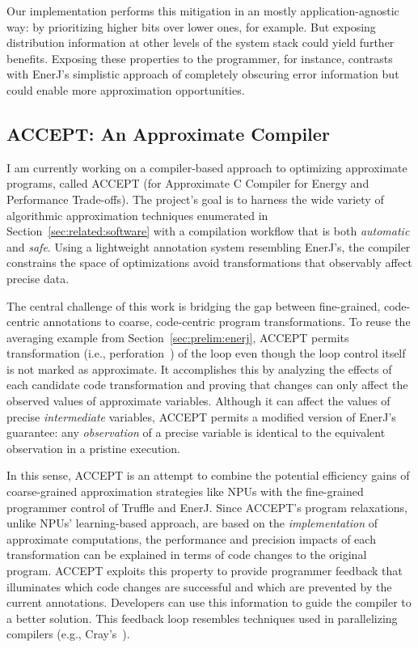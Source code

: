 Our implementation performs this mitigation in an mostly application-agnostic
way: by prioritizing higher bits over lower ones, for example. But exposing
distribution information at other levels of the system stack could yield
further benefits. Exposing these properties to the programmer, for instance,
contrasts with EnerJ's simplistic approach of completely obscuring error
information but could enable more approximation opportunities.

\subsection{ACCEPT: An Approximate Compiler}
\label{sec:prelim:accept}

I am currently working on a compiler-based approach to optimizing approximate
programs, called ACCEPT (for Approximate C Compiler for Energy and Performance
Trade-offs). The project's goal is to harness the wide variety of
algorithmic approximation techniques enumerated in
Section~\ref{sec:related:software} with a compilation workflow that is both
\emph{automatic} and \emph{safe}. Using a lightweight annotation system
resembling EnerJ's, the compiler constrains the space of optimizations avoid
transformations that observably affect precise data.

The central challenge of this work is bridging the gap between fine-grained,
code-centric annotations to coarse, code-centric program transformations. To
reuse the averaging example from Section~\ref{sec:prelim:enerj}, ACCEPT
permits transformation (i.e., perforation~\cite{perforation}) of the
 loop even though the loop control itself is not marked as
approximate. It accomplishes this by analyzing the effects of each candidate
code transformation and proving that changes can only affect the
observed values of approximate variables. Although it can affect the values of
precise \emph{intermediate} variables, ACCEPT permits a modified version of
EnerJ's guarantee: any \emph{observation} of a precise variable is identical
to the equivalent observation in a pristine execution.

In this sense, ACCEPT is an attempt to combine the potential efficiency gains
of coarse-grained approximation strategies like NPUs with the fine-grained
programmer control of Truffle and EnerJ. Since ACCEPT's program relaxations,
unlike NPUs' learning-based approach, are based on the \emph{implementation}
of approximate computations, the performance and precision impacts of each
transformation can be explained in terms of code changes to the original
program. ACCEPT exploits this property to provide programmer feedback that
illuminates which code changes are successful and which are prevented by the
current annotations. Developers can use this information to guide the compiler
to a better solution. This feedback loop resembles techniques used in
parallelizing compilers (e.g., Cray's~\cite{canal}).

